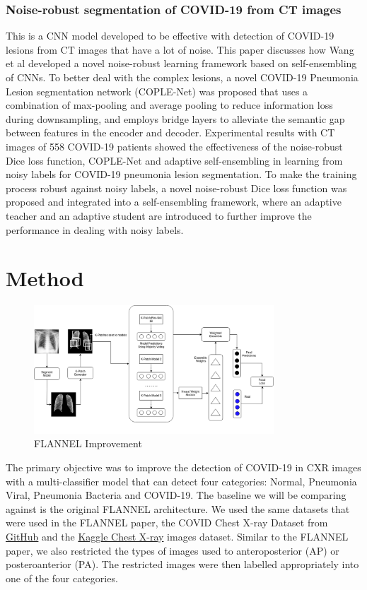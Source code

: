 \documentclass{sigkddExp}
\begin{document}
\subsubsection{Noise-robust segmentation of COVID-19 from CT images}

This is a CNN model \cite{wang2020covidnet} developed to be effective with
detection of COVID-19 lesions from CT images that have a lot of noise. This
paper discusses how Wang et al developed a novel noise-robust learning framework
based on self-ensembling of CNNs.  To better deal with the complex lesions, a
novel COVID-19 Pneumonia Lesion segmentation network (COPLE-Net) was proposed
that uses a combination of max-pooling and average pooling to reduce information
loss during downsampling, and employs bridge layers to alleviate the semantic
gap between features in the encoder and decoder. Experimental results with CT
images of 558 COVID-19 patients showed the effectiveness of the noise-robust
Dice loss function, COPLE-Net and adaptive self-ensembling in learning from
noisy labels for COVID-19 pneumonia lesion segmentation. To make the training
process robust against noisy labels, a novel noise-robust Dice loss function was
proposed and integrated into a self-ensembling framework, where an adaptive
teacher and an adaptive student are introduced to further improve the
performance in dealing with noisy labels.


\section{Method}

\begin{figure}[h]
    \centering
    \includegraphics[width=0.8\textwidth]{../doc/images/FLANNEL-IMPROVED.png}
    \caption{FLANNEL Improvement}
    \label{fig:improve}
\end{figure}

The primary objective was to improve the detection of COVID-19 in CXR images
with a multi-classifier model that can detect four categories: Normal, Pneumonia
Viral, Pneumonia Bacteria and COVID-19. The baseline we will be comparing
against is the original FLANNEL architecture. We used the same datasets that
were used in the FLANNEL paper, the COVID Chest X-ray Dataset
\cite{cohen2020covidProspective} from
\href{https://github.com/ieee8023/covid-chestxray-dataset}{GitHub} and the
\href{https://www.kaggle.com/paultimothymooney/chest-xray-pneumonia}{Kaggle
    Chest X-ray} images dataset. Similar to the FLANNEL paper, we also restricted
the types of images used to anteroposterior (AP) or posteroanterior (PA). The
restricted images were then labelled appropriately into one of the four
categories.
\end{document}
